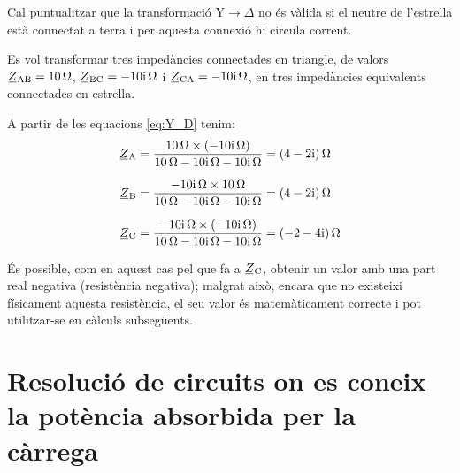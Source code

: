 \begin{center}
    
    \label{pic:Y_D}
\end{center}

Cal puntualitzar que la transformació $\text{Y}\rightarrow\Delta$ no és vàlida si el  neutre de l'estrella  està connectat a terra i per aquesta connexió hi circula corrent.
	
\begin{exemple}\label{ex:TriangleEstrella}
	\addcontentsxms{\TriangleEstrella}
    Es vol transformar tres impedàncies connectades en triangle, de
    valors $ \cmplx{Z}\ped{AB}=\qty{10}{\ohm}$,
    $\cmplx{Z}\ped{BC}=\complexqty{-j10}{\ohm}$ i
    $\cmplx{Z}\ped{CA}=\complexqty{-j10}{\ohm}$, en tres impedàncies
    equivalents connectades en estrella.

    A partir de les equacions \eqref{eq:Y_D}  tenim:
    \begin{align*}
       \cmplx{Z}\ped{A} & = \frac{\qty{10}{\ohm}\times(\complexqty{-j10}{\ohm})}{\qty{10}{\ohm} - \complexqty{j10}{\ohm} - \complexqty{j10}{\ohm}} = \complexqty{4-j2}{\ohm} \\[1.5ex]
       \cmplx{Z}\ped{B} & = \frac{\complexqty{-j10}{\ohm}\times \qty{10}{\ohm}}{\qty{10}{\ohm} - \complexqty{j10}{\ohm} - \complexqty{j10}{\ohm}} = \complexqty{4-j2}{\ohm} \\[1.5ex]
    \cmplx{Z}\ped{C} &= \frac{\complexqty{-j10}{\ohm}\times(\complexqty{-j10}{\ohm})}{\qty{10}{\ohm} -
    \complexqty{j10}{\ohm} - \complexqty{j10}{\ohm}} = \complexqty{-2-j4}{\ohm}
    \end{align*}

    És possible, com en aquest cas pel que fa a $\cmplx{Z}\ped{C}$,
    obtenir un valor amb una part real negativa (resistència negativa);
    malgrat això, encara que no existeixi físicament aquesta resistència,
    el seu valor és matemàticament correcte i  pot utilitzar-se en
    càlculs subsegüents.
\end{exemple}



\section{Resolució de circuits on es coneix la potència absorbida per la
càrrega}\label{sec:EZS}

